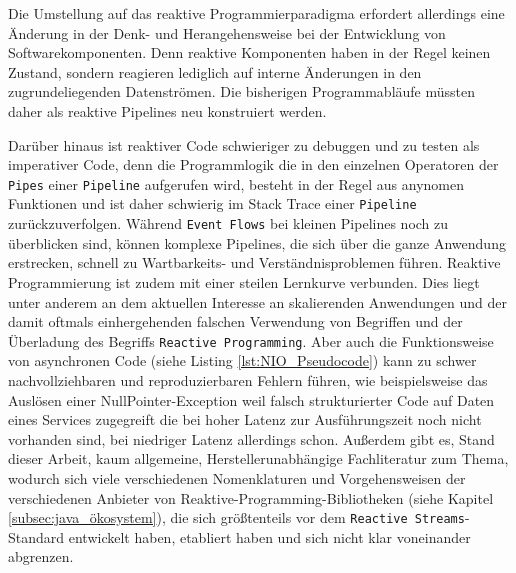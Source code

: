 Die Umstellung auf das reaktive Programmierparadigma erfordert allerdings eine Änderung in der Denk- und Herangehensweise bei der
Entwicklung von Softwarekomponenten. Denn reaktive Komponenten haben in der Regel keinen Zustand,
sondern reagieren lediglich auf interne Änderungen in den zugrundeliegenden Datenströmen.
Die bisherigen Programmabläufe müssten daher als reaktive Pipelines neu konstruiert werden.

Darüber hinaus ist reaktiver Code schwieriger zu debuggen und zu testen als imperativer Code, denn die Programmlogik die in den einzelnen Operatoren
der \verb|Pipes| einer \verb|Pipeline| aufgerufen wird, besteht in der Regel aus anynomen Funktionen und ist daher schwierig im Stack Trace einer
\verb|Pipeline| zurückzuverfolgen.
Während \verb|Event Flows| bei kleinen Pipelines noch zu überblicken sind, können komplexe Pipelines, die sich über die ganze Anwendung erstrecken,
schnell zu Wartbarkeits- und Verständnisproblemen führen.
Reaktive Programmierung ist zudem mit einer steilen Lernkurve verbunden. Dies liegt unter anderem an dem aktuellen Interesse an skalierenden
Anwendungen und der damit oftmals einhergehenden falschen Verwendung von Begriffen und der Überladung des Begriffs \verb|Reactive Programming|.
Aber auch die Funktionsweise von asynchronen Code (siehe Listing \ref{lst:NIO_Pseudocode}) kann zu schwer nachvollziehbaren und
reproduzierbaren Fehlern führen, wie beispielsweise das Auslösen einer NullPointer-Exception weil falsch strukturierter Code
auf Daten eines Services zugegreift die bei hoher Latenz zur Ausführungszeit noch nicht vorhanden sind, bei niedriger Latenz
allerdings schon.
Außerdem gibt es, Stand dieser Arbeit, kaum allgemeine, Herstellerunabhängige Fachliteratur zum Thema, wodurch sich viele verschiedenen Nomenklaturen und Vorgehensweisen der verschiedenen Anbieter von
Reaktive-Programming-Bibliotheken (siehe Kapitel \ref{subsec:java_ökosystem}), die sich größtenteils vor dem \verb|Reactive Streams|-Standard entwickelt haben, etabliert haben
und sich nicht klar voneinander abgrenzen.

